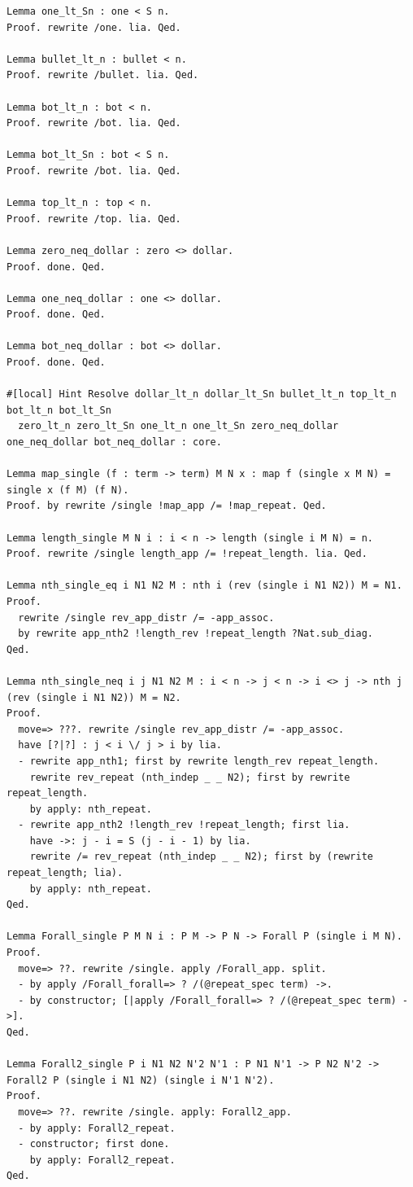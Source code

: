 \begin{lstlisting}
Lemma one_lt_Sn : one < S n.
Proof. rewrite /one. lia. Qed.

Lemma bullet_lt_n : bullet < n.
Proof. rewrite /bullet. lia. Qed.

Lemma bot_lt_n : bot < n.
Proof. rewrite /bot. lia. Qed.

Lemma bot_lt_Sn : bot < S n.
Proof. rewrite /bot. lia. Qed.

Lemma top_lt_n : top < n.
Proof. rewrite /top. lia. Qed.

Lemma zero_neq_dollar : zero <> dollar.
Proof. done. Qed.

Lemma one_neq_dollar : one <> dollar.
Proof. done. Qed.

Lemma bot_neq_dollar : bot <> dollar.
Proof. done. Qed.

#[local] Hint Resolve dollar_lt_n dollar_lt_Sn bullet_lt_n top_lt_n bot_lt_n bot_lt_Sn
  zero_lt_n zero_lt_Sn one_lt_n one_lt_Sn zero_neq_dollar one_neq_dollar bot_neq_dollar : core.

Lemma map_single (f : term -> term) M N x : map f (single x M N) = single x (f M) (f N).
Proof. by rewrite /single !map_app /= !map_repeat. Qed.

Lemma length_single M N i : i < n -> length (single i M N) = n.
Proof. rewrite /single length_app /= !repeat_length. lia. Qed.

Lemma nth_single_eq i N1 N2 M : nth i (rev (single i N1 N2)) M = N1.
Proof.
  rewrite /single rev_app_distr /= -app_assoc.
  by rewrite app_nth2 !length_rev !repeat_length ?Nat.sub_diag.
Qed.

Lemma nth_single_neq i j N1 N2 M : i < n -> j < n -> i <> j -> nth j (rev (single i N1 N2)) M = N2.
Proof.
  move=> ???. rewrite /single rev_app_distr /= -app_assoc.
  have [?|?] : j < i \/ j > i by lia.
  - rewrite app_nth1; first by rewrite length_rev repeat_length.
    rewrite rev_repeat (nth_indep _ _ N2); first by rewrite repeat_length.
    by apply: nth_repeat.
  - rewrite app_nth2 !length_rev !repeat_length; first lia.
    have ->: j - i = S (j - i - 1) by lia.
    rewrite /= rev_repeat (nth_indep _ _ N2); first by (rewrite repeat_length; lia).
    by apply: nth_repeat.
Qed.

Lemma Forall_single P M N i : P M -> P N -> Forall P (single i M N).
Proof.
  move=> ??. rewrite /single. apply /Forall_app. split.
  - by apply /Forall_forall=> ? /(@repeat_spec term) ->.
  - by constructor; [|apply /Forall_forall=> ? /(@repeat_spec term) ->].
Qed.

Lemma Forall2_single P i N1 N2 N'2 N'1 : P N1 N'1 -> P N2 N'2 -> Forall2 P (single i N1 N2) (single i N'1 N'2).
Proof.
  move=> ??. rewrite /single. apply: Forall2_app.
  - by apply: Forall2_repeat.
  - constructor; first done.
    by apply: Forall2_repeat.
Qed.


\end{lstlisting}
